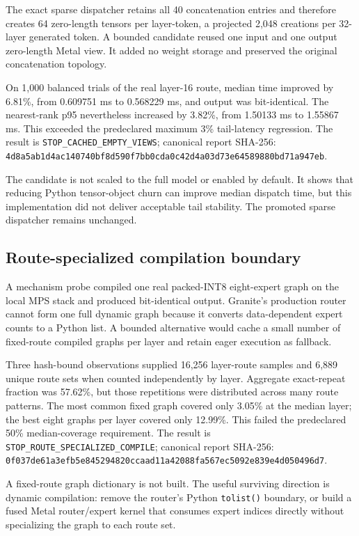 The exact sparse dispatcher retains all 40 concatenation entries and therefore
creates 64 zero-length tensors per layer-token, a projected 2,048 creations per
32-layer generated token. A bounded candidate reused one input and one output
zero-length Metal view. It added no weight storage and preserved the original
concatenation topology.

On 1,000 balanced trials of the real layer-16 route, median time improved by
6.81\%, from 0.609751 ms to 0.568229 ms, and output was bit-identical. The
nearest-rank p95 nevertheless increased by 3.82\%, from 1.50133 ms to 1.55867
ms. This exceeded the predeclared maximum 3\% tail-latency regression. The
result is \texttt{STOP\_CACHED\_EMPTY\_VIEWS}; canonical report SHA-256:
\texttt{4d8a5ab1d4ac140740bf8d590f7bb0cda0c42d4a03d73e64589880bd71a947eb}.

The candidate is not scaled to the full model or enabled by default. It shows
that reducing Python tensor-object churn can improve median dispatch time, but
this implementation did not deliver acceptable tail stability. The promoted
sparse dispatcher remains unchanged.

\subsection{Route-specialized compilation boundary}

A mechanism probe compiled one real packed-INT8 eight-expert graph on the local
MPS stack and produced bit-identical output. Granite's production router cannot
form one full dynamic graph because it converts data-dependent expert counts to
a Python list. A bounded alternative would cache a small number of fixed-route
compiled graphs per layer and retain eager execution as fallback.

Three hash-bound observations supplied 16,256 layer-route samples and 6,889
unique route sets when counted independently by layer. Aggregate exact-repeat
fraction was 57.62\%, but those repetitions were distributed across many route
patterns. The most common fixed graph covered only 3.05\% at the median layer;
the best eight graphs per layer covered only 12.99\%. This failed the
predeclared 50\% median-coverage requirement. The result is
\texttt{STOP\_ROUTE\_SPECIALIZED\_COMPILE}; canonical report SHA-256:
\texttt{0f037de61a3efb5e845294820ccaad11a42088fa567ec5092e839e4d050496d7}.

A fixed-route graph dictionary is not built. The useful surviving direction is
dynamic compilation: remove the router's Python \texttt{tolist()} boundary, or
build a fused Metal router/expert kernel that consumes expert indices directly
without specializing the graph to each route set.


